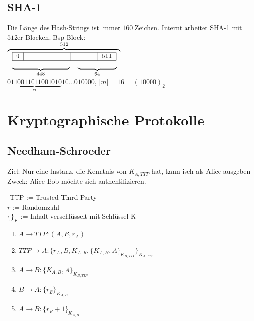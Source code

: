 \documentclass[landscape,twocolumn,a4paper]{article}
\newcommand{\Abs}[1]{\left| #1 \right|} %
\begin{document}
\subsection{SHA-1}
Die Länge des Hash-Strings ist immer $160$ Zeichen. Internt arbeitet SHA-1 mit $512$er Blöcken. Bsp Block: \\
$\overbrace{
\begin{tabular}{cc}
 \multicolumn{2}{c}{\begin{tabular}{|c|c|l|c|}\hline
  0&\hspace*{2cm}&\hspace*{1cm}&511\\\hline
 \end{tabular}}\\
 $\underbrace{\hspace*{3cm}}_{448}$&$\underbrace{\hspace*{2cm}}_{64}$
\end{tabular}}^{512}$\\
$\underbrace{0110011011001010}_m10\dots010000$, $\Abs{m}=16=(10000)_2$\\

\section{Kryptographische Protokolle}
\subsection{Needham-Schroeder}
Ziel: Nur eine Instanz, die Kenntnis von $K_{A,TTP}$ hat, kann isch als Alice ausgeben\\
Zweck: Alice Bob möchte sich authentifizieren.\\

\begin{tabbing}
\hspace{2em}\=\kill
TTP \> := Trusted Third Party\\
$r$ \> := Randomzahl\\
$\{\}_K$ \> := Inhalt verschlüsselt mit Schlüssel K\\
\end{tabbing} 

\begin{enumerate}
\item $A \rightarrow TTP: (A,B,r_A)$
\item $TTP \rightarrow A: \{r_A,B,K_{A,B},\{K_{A,B},A\}_{K_{B,TTP}}\}_{K_{A,TTP}}$
\item $A \rightarrow B: \{K_{A,B},A\}_{K_{B,TTP}}$
\item $B \rightarrow A: \{r_B\}_{K_{A,B}}$
\item $A \rightarrow B: \{r_B+1\}_{K_{A,B}}$
\end{enumerate}
\end{document}
